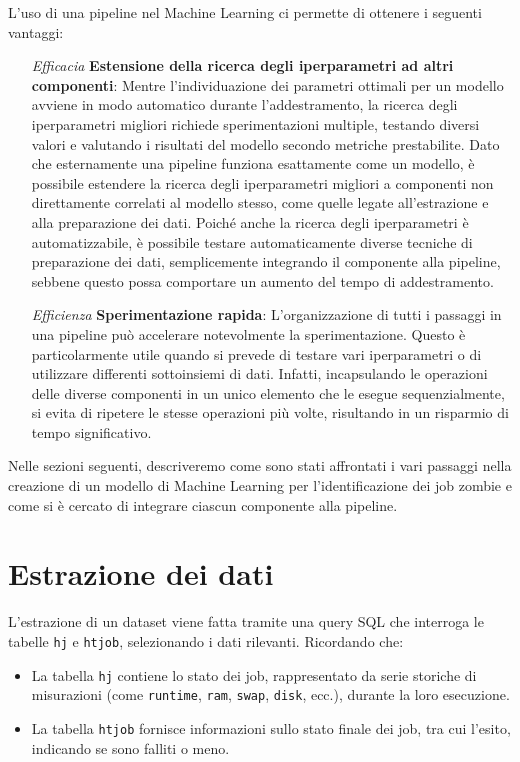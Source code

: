 L'uso di una pipeline nel Machine Learning ci permette di ottenere i seguenti
vantaggi:
\begin{itemize}
    \item[\textit{Efficacia}] \textbf{Estensione della ricerca degli
        iperparametri ad altri componenti}: Mentre l'individuazione dei
        parametri ottimali per un modello avviene in modo automatico durante
        l'addestramento, la ricerca degli iperparametri migliori richiede
        sperimentazioni multiple, testando diversi valori e valutando i
        risultati del modello secondo metriche prestabilite. Dato che
        esternamente una pipeline funziona esattamente come un modello, è
        possibile estendere la ricerca degli iperparametri migliori a
        componenti non direttamente correlati al modello stesso, come quelle
        legate all'estrazione e alla preparazione dei dati. Poiché anche la
        ricerca degli iperparametri è automatizzabile, è possibile testare
        automaticamente diverse tecniche di preparazione dei dati,
        semplicemente integrando il componente alla pipeline, sebbene questo
        possa comportare un aumento del tempo di addestramento.
    \item [\textit{Efficienza}]\textbf{Sperimentazione rapida}:
        L'organizzazione di tutti i passaggi in una pipeline può accelerare
        notevolmente la sperimentazione. Questo è particolarmente utile quando
        si prevede di testare vari iperparametri o di utilizzare differenti
        sottoinsiemi di dati. Infatti, incapsulando le operazioni delle
        diverse componenti in un unico elemento che le esegue sequenzialmente,
        si evita di ripetere le stesse operazioni più volte, risultando in un
        risparmio di tempo significativo.
\end{itemize}

Nelle sezioni seguenti, descriveremo come sono stati affrontati i vari
passaggi nella creazione di un modello di Machine Learning per
l'identificazione dei job zombie e come si è cercato di integrare ciascun
componente alla pipeline.

\section{Estrazione dei dati}

L'estrazione di un dataset viene fatta tramite una query SQL che interroga le
tabelle \texttt{hj} e \texttt{htjob}, selezionando i dati rilevanti.
Ricordando che:
\begin{itemize}
    \item La tabella \texttt{hj} contiene lo stato dei job, rappresentato da
        serie storiche di misurazioni (come \texttt{runtime}, \texttt{ram},
        \texttt{swap}, \texttt{disk}, ecc.),
        durante la loro esecuzione.
    \item La tabella \texttt{htjob} fornisce informazioni sullo stato finale
        dei job, tra cui l'esito, indicando se sono falliti o meno.
\end{itemize}

